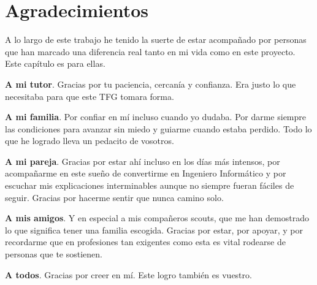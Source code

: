 \chapter*{Agradecimientos}
\begingroup
\setlength{\parindent}{0pt}
\setlength{\parskip}{0.35cm}
A lo largo de este trabajo he tenido la suerte de estar acompañado por personas que han marcado una diferencia real tanto en mi vida como en este proyecto. Este capítulo es para ellas.

\textbf{A mi tutor}.
Gracias por tu paciencia, cercanía y confianza. Era justo lo que necesitaba para que este TFG tomara forma.

\textbf{A mi familia}.
Por confiar en mí incluso cuando yo dudaba. Por darme siempre las condiciones para avanzar sin miedo y guiarme cuando estaba perdido. Todo lo que he logrado lleva un pedacito de vosotros.

\textbf{A mi pareja}.
Gracias por estar ahí incluso en los días más intensos, por acompañarme en este sueño de convertirme en Ingeniero Informático y por escuchar mis explicaciones interminables aunque no siempre fueran fáciles de seguir. Gracias por hacerme sentir que nunca camino solo.

\textbf{A mis amigos}.
Y en especial a mis compañeros scouts, que me han demostrado lo que significa tener una familia escogida. Gracias por estar, por apoyar, y por recordarme que en profesiones tan exigentes como esta es vital rodearse de personas que te sostienen.

\textbf{A todos}.
Gracias por creer en mí. Este logro también es vuestro.
\endgroup